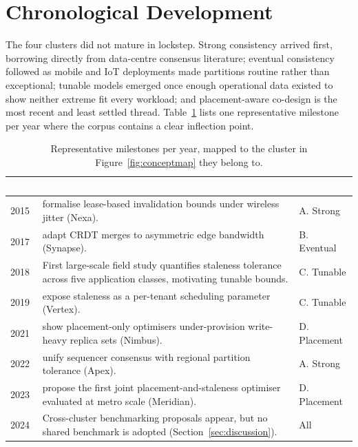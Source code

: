 \section{Chronological Development}
\label{sec:chronology}

The four clusters did not mature in lockstep. Strong consistency arrived first, borrowing directly from
data-centre consensus literature; eventual consistency followed as mobile and IoT deployments made
partitions routine rather than exceptional; tunable models emerged once enough operational data existed
to show neither extreme fit every workload; and placement-aware co-design is the most recent and least
settled thread. Table~\ref{tab:timeline} lists one representative milestone per year where the corpus
contains a clear inflection point.

\begin{table}[h!]
\centering
\small
\begin{tabularx}{\textwidth}{@{}p{1.6cm}Xp{2.6cm}@{}}
\toprule
\rowcolor{nx@teal}
\textcolor{white}{\textbf{Year}} & \textcolor{white}{\textbf{Milestone}} & \textcolor{white}{\textbf{Cluster}} \\
\midrule
2015 & \citet{chen2015nexa} formalise lease-based invalidation bounds under wireless jitter (Nexa). & A. Strong \\
\rowcolor{nx@mist}
2017 & \citet{patel2017synapse} adapt CRDT merges to asymmetric edge bandwidth (Synapse). & B. Eventual \\
2018 & First large-scale field study quantifies staleness tolerance across five application classes, motivating tunable bounds. & C. Tunable \\
\rowcolor{nx@mist}
2019 & \citet{osei2019vertex} expose staleness as a per-tenant scheduling parameter (Vertex). & C. Tunable \\
2021 & \citet{alvarez2021nimbus} show placement-only optimisers under-provision write-heavy replica sets (Nimbus). & D. Placement \\
\rowcolor{nx@mist}
2022 & \citet{kim2022apex} unify sequencer consensus with regional partition tolerance (Apex). & A. Strong \\
2023 & \citet{nakamura2023meridian} propose the first joint placement-and-staleness optimiser evaluated at metro scale (Meridian). & D. Placement \\
\rowcolor{nx@mist}
2024 & Cross-cluster benchmarking proposals appear, but no shared benchmark is adopted (Section~\ref{sec:discussion}). & All \\
\bottomrule
\end{tabularx}
\caption{Representative milestones per year, mapped to the cluster in Figure~\ref{fig:conceptmap}
they belong to.}
\label{tab:timeline}
\end{table}

